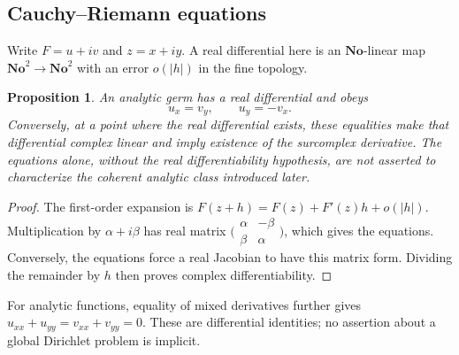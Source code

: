 \documentclass[11pt,a4paper]{article}
\newtheorem{proposition}[theorem]{Proposition}
\theoremstyle{definition}
\theoremstyle{remark}
\newcommand{\No}{\mathbf{No}}
\begin{document}
\subsection{Cauchy--Riemann equations}
Write $F=u+iv$ and $z=x+iy$. A real differential here is an
$\No$-linear map $\No^2\to\No^2$ with an error $o(|h|)$ in the
fine topology.
\begin{proposition}\label{prop:CR}
An analytic germ has a real differential and obeys
\[
 u_x=v_y,\qquad u_y=-v_x.
\]
Conversely, at a point where the real differential exists, these
equalities make that differential complex linear and imply existence
of the surcomplex derivative. The equations alone, without the real
differentiability hypothesis, are not asserted to characterize the
coherent analytic class introduced later.
\end{proposition}
\begin{proof}
The first-order expansion is
$F(z+h)=F(z)+F'(z)h+o(|h|)$. Multiplication by
$\alpha+i\beta$ has real matrix
$\bigl(\begin{smallmatrix}\alpha&-\beta\\\beta&\alpha\end{smallmatrix}\bigr)$,
which gives the equations. Conversely, the equations force a real
Jacobian to have this matrix form. Dividing the remainder by $h$
then proves complex differentiability.
\end{proof}
For analytic functions, equality of mixed derivatives further gives
$u_{xx}+u_{yy}=v_{xx}+v_{yy}=0$. These are differential identities;
no assertion about a global Dirichlet problem is implicit.
\end{document}
